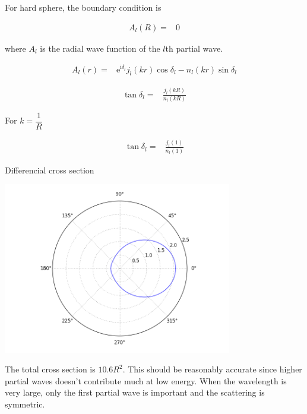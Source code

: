 \documentclass[10pt,fleqn]{article}
\newcommand{\ue}{\mathrm{e}}
\newcommand{\ui}{\mathrm{i}}
\newcommand{\eqar}[1]
{
  \begin{align*}
    #1
  \end{align*}
}
\newcommand{\paren}[1]{{\left({#1}\right)}}
\begin{document}
\section{}
For hard sphere, the boundary condition is
\eqar{
  A_l\paren{R}=&0
}
where $A_l$ is the radial wave function of the $l$th partial wave.
\eqar{
  A_l\paren{r}=&\ue^{\ui\delta_l}j_l(kr)\cos\delta_l-n_l(kr)\sin\delta_l
}
\eqar{
  \tan\delta_l=&\frac{j_l\paren{kR}}{n_l\paren{kR}}
}
For $k=\dfrac1R$
\eqar{
  \tan\delta_l=&\frac{j_l\paren{1}}{n_l\paren{1}}
}
Differencial cross section
\begin{center}
  \includegraphics[width=10cm]{p5_3wave_kr1.png}
\end{center}
The total cross section is $10.6R^2$.
This should be reasonably accurate since higher partial waves doesn't contribute
much at low energy. When the wavelength is very large,
only the first partial wave is important and the scattering is symmetric.
\end{document}
